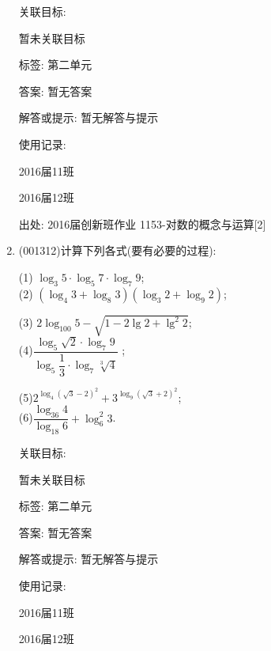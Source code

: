 \documentclass[10pt,a4paper]{article}
\begin{document}
\begin{enumerate}[1.]
关联目标:

暂未关联目标



标签: 第二单元

答案: 暂无答案

解答或提示: 暂无解答与提示

使用记录:

2016届11班		

2016届12班		


出处: 2016届创新班作业	1153-对数的概念与运算[2]
\item { (001312)}计算下列各式(要有必要的过程):\\ 
\begin{multicols}{2}
(1) $\log_3 5\cdot\log_5 7\cdot\log_7 9$; \\ 
(2) $(\log_4 3+\log_8 3)(\log_3 2+\log_9 2)$;\\ 
\end{multicols}
\begin{multicols}{2}
(3) $2\log_{100} 5-\sqrt{1-2\lg2+\lg^2 2}$; \\ 
(4)$\dfrac{\log_5 \sqrt{2}\cdot\log_7 9}{\log_5\dfrac{1}{3}\cdot\log_7\sqrt[3]{4}}$ ;
\end{multicols}
\begin{multicols}{2}
(5)$2^{\log_4(\sqrt{3}-2)^2}+3^{\log_9(\sqrt{3}+2)^2}$;  \\ 
(6)$\dfrac{\log_{36}4}{\log_{18}6}+\log_6^2 3$.\\ 
\end{multicols}


关联目标:

暂未关联目标



标签: 第二单元

答案: 暂无答案

解答或提示: 暂无解答与提示

使用记录:

2016届11班						

2016届12班						



\end{enumerate}
\end{document}
